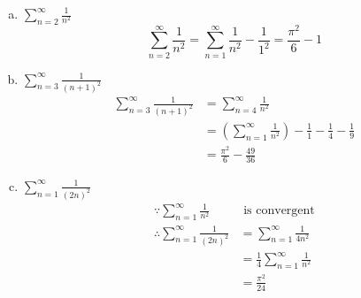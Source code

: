 \documentclass{article}
\begin{document}
    \begin{enumerate}[(a)]
        \item $\sum_{n=2}^\infty \frac{1}{n^2}$
        $$\sum_{n=2}^\infty \frac{1}{n^2} = \sum_{n=1}^\infty \frac{1}{n^2} - \frac{1}{1^2} = \frac{\pi^2}{6} - 1$$

        \item $\sum_{n=3}^\infty \frac{1}{(n+1)^2}$
        $$\begin{aligned}
            \sum_{n=3}^\infty \frac{1}{(n+1)^2} &= \sum_{n=4}^\infty \frac{1}{n^2} \\
            &= (\sum_{n=1}^\infty \frac{1}{n^2}) - \frac{1}{1} - \frac{1}{4} - \frac{1}{9} \\
            &= \frac{\pi^2}{6} - \frac{49}{36}
        \end{aligned}$$

        \item $\sum_{n=1}^\infty \frac{1}{(2n)^2}$
        $$\begin{aligned}
            \because \sum_{n=1}^\infty \frac{1}{n^2} &\textrm{ is convergent} \\
            \therefore \sum_{n=1}^\infty \frac{1}{(2n)^2} &= \sum_{n=1}^\infty \frac{1}{4n^2} \\
            &= \frac 1 4 \sum_{n=1}^\infty \frac{1}{n^2} \\
            &= \frac{\pi^2}{24}
        \end{aligned}$$
    \end{enumerate}
\end{document}
